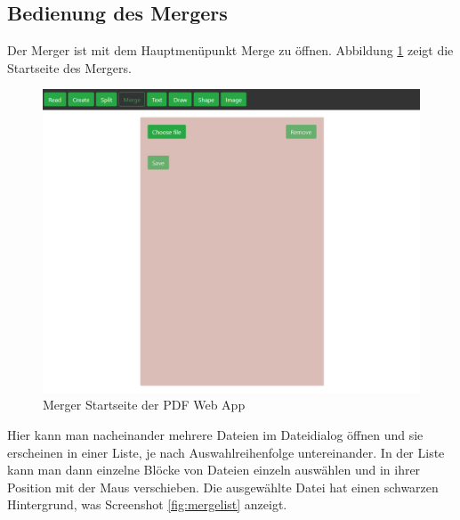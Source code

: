 \subsection{Bedienung des Mergers}
Der Merger ist mit dem Hauptmenüpunkt Merge zu öffnen. Abbildung \ref{fig:merger} zeigt die Startseite des Mergers. 
\begin{figure}[!htbp]
	\centering
	\includegraphics[width=1\textwidth]{"images/merger.png"}
	\caption{Merger Startseite der PDF Web App}
	\label{fig:merger}
\end{figure}
Hier kann man nacheinander mehrere Dateien im Dateidialog öffnen und sie erscheinen in einer Liste, je nach Auswahlreihenfolge untereinander. In der Liste kann man dann einzelne Blöcke von Dateien einzeln auswählen und in ihrer Position mit der Maus verschieben. Die ausgewählte Datei hat einen schwarzen Hintergrund, was Screenshot \ref{fig:mergelist} anzeigt.
